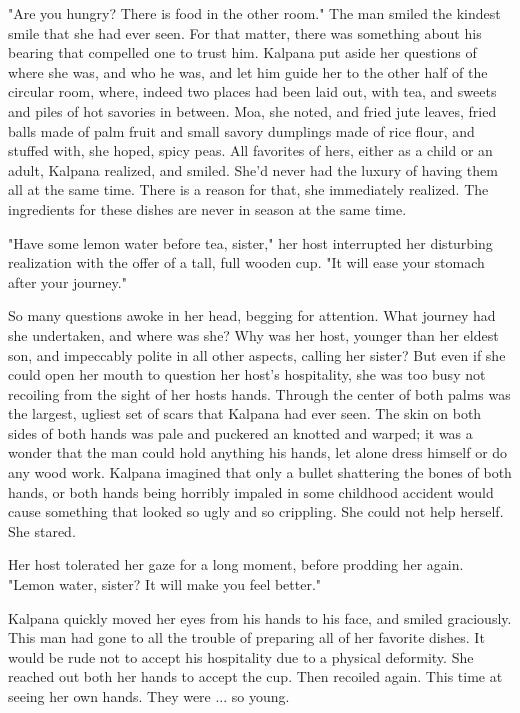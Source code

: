 \documentclass{amsart}
\begin{document}
	"Are you hungry? There is food in the other room." The man smiled the kindest
	smile that she had ever seen. For that matter, there was something about his
	bearing that compelled one to trust him. Kalpana put aside her questions of
	where she was, and who he was, and let him guide her to the other half of the
	circular room, where, indeed two places had been laid out, with tea, and sweets
	and piles of hot savories in between. Moa, she noted, and fried jute leaves,
	fried balls made of palm fruit and small savory dumplings made of rice flour,
	and stuffed with, she hoped, spicy peas. All favorites of hers, either as a
	child or an adult, Kalpana realized, and smiled. She'd never had the luxury of
	having them all at the same time. There is a reason for that, she immediately
	realized. The ingredients for these dishes are never in season at the same time.
	
	"Have some lemon water before tea, sister," her host interrupted her disturbing
	realization with the offer of a tall, full wooden cup. "It will ease your
	stomach after your journey."
	
	So many questions awoke in her head, begging for attention. What journey had she
	undertaken, and where was she? Why was her host, younger than her eldest son,
	and impeccably polite in all other aspects, calling her sister?  But even if she
	could open her mouth to question her host's hospitality, she was too busy not
	recoiling from the sight of her hosts hands. Through the center of both palms
	was the largest, ugliest set of scars that Kalpana had ever seen. The skin on
	both sides of both hands was pale and puckered an knotted and warped; it was a
	wonder that the man could hold anything his hands, let alone dress himself or do
	any wood work. Kalpana imagined that only a bullet shattering the bones of both
	hands, or both hands being horribly impaled in some childhood accident would
	cause something that looked so ugly and so crippling. She could not help
	herself. She stared.
	
	Her host tolerated her gaze for a long moment, before prodding her again. "Lemon
	water, sister? It will make you feel better." 
	
	Kalpana quickly moved her eyes from his hands to his face, and smiled
	graciously. This man had gone to all the trouble of preparing all of her
	favorite dishes. It would be rude not to accept his hospitality due to a
	physical deformity. She reached out both her hands to accept the cup. Then
	recoiled again. This time at seeing her own hands. They were ... so young.
	
\end{document}
